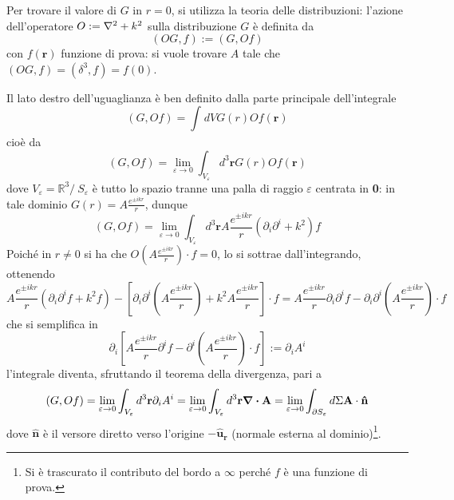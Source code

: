 
Per trovare il valore di $G$ in $r=0$, si utilizza la teoria delle distribuzioni:
l'azione dell'operatore $O:=\laplacian+k^2$ sulla distribuzione $G$ è definita da
$$(OG,f):=(G,Of)$$
con $f(\mathbf{r})$ funzione di prova: si vuole trovare $A$ tale che
$(OG,f) = (\delta^3,f) = f(0)$.

Il lato destro dell'uguaglianza è ben definito dalla parte principale dell'integrale
$$(G,Of)=\int_{}^{}dVG(r)Of(\mathbf{r})$$
cioè da
$$(G,Of)=\lim\limits_{\varepsilon\to0}\int_{V_\varepsilon}^{}d^3\mathbf{r}G(r)Of(\mathbf{r})$$
dove $V_\varepsilon = \mathbb{R}^3 /\ S_\varepsilon$ è tutto lo spazio tranne una palla di raggio
$\varepsilon$ centrata in \textbf{0}: in tale dominio $G(r)=A\frac{e^{\pm ikr}}{r}$, dunque
$$(G,Of) = \lim\limits_{\varepsilon\to0}
\int_{V_\varepsilon}^{}d^3\mathbf{r}A\frac{e^{\pm ikr}}{r}(\partial_i\partial^i+k^2)f$$
Poiché in $r\not=0$ si ha che $O\left(A\frac{e^{\pm ikr}}{r}\right)\cdot f=0$, lo si sottrae
dall'integrando, ottenendo
$$A\frac{e^{\pm ikr}}{r}\left(\partial_i\partial^i f + k^2f\right)-
\left[\partial_i\partial^i\left(A\frac{e^{\pm ikr}}{r}\right)+k^2A\frac{e^{\pm ikr}}{r}\right]\cdot f
= A\frac{e^{\pm ikr}}{r}\partial_i\partial^if - \partial_i\partial^i\left(A\frac{e^{\pm ikr}}{r}
\right)\cdot f$$
che si semplifica in
$$\partial_i \left[A\frac{e^{\pm ikr}}{r}\partial^if-\partial^i\left(A\frac{e^{\pm ikr}}{r}\right)
\cdot f\right]:=\partial_iA^i$$
l'integrale diventa, sfruttando il teorema della divergenza, pari a
$$(G,Of) = \lim\limits_{\varepsilon\to0}
\int_{V_\varepsilon}^{}d^3\mathbf{r}\partial_iA^i = 
\lim\limits_{\varepsilon\to0}
\int_{V_\varepsilon}^{}d^3\mathbf{r}\divergence \mathbf{A} = 
\lim\limits_{\varepsilon\to0}\int_{\partial S_\varepsilon}^{}d\Sigma\mathbf{A}\cdot\mathbf{\hat n}
$$
dove $\mathbf{\hat n}$ è il versore diretto verso l'origine $-\mathbf{\hat u_r}$
(normale esterna al dominio)\footnote{
Si è trascurato il contributo del bordo a $\infty$ perché $f$ è una funzione di prova.}.

